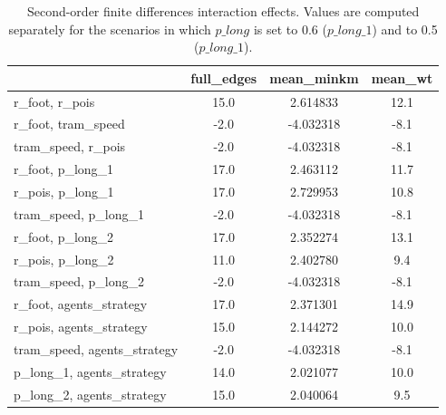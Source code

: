 
\begin{table}[H]
    \raggedright
\scriptsize{
\begin{tabular}{lccc}
\toprule
{} &  full\_edges &  mean\_minkm &  mean\_wt \\
\midrule
r\_foot, r\_pois              &        15.0 &    2.614833 &                  12.1 \\
r\_foot, tram\_speed          &        -2.0 &   -4.032318 &                  -8.1 \\
tram\_speed, r\_pois          &        -2.0 &   -4.032318 &                  -8.1 \\
r\_foot, p\_long\_1            &        17.0 &    2.463112 &                  11.7 \\
r\_pois, p\_long\_1            &        17.0 &    2.729953 &                  10.8 \\
tram\_speed, p\_long\_1        &        -2.0 &   -4.032318 &                  -8.1 \\
r\_foot, p\_long\_2            &        17.0 &    2.352274 &                  13.1 \\
r\_pois, p\_long\_2            &        11.0 &    2.402780 &                   9.4 \\
tram\_speed, p\_long\_2        &        -2.0 &   -4.032318 &                  -8.1 \\
r\_foot, agents\_strategy     &        17.0 &    2.371301 &                  14.9 \\
r\_pois, agents\_strategy     &        15.0 &    2.144272 &                  10.0 \\
tram\_speed, agents\_strategy &        -2.0 &   -4.032318 &                  -8.1 \\
p\_long\_1, agents\_strategy   &        14.0 &    2.021077 &                  10.0 \\
p\_long\_2, agents\_strategy   &        15.0 &    2.040064 &                   9.5 \\
\bottomrule
\end{tabular}}
    \caption{Second-order finite differences interaction effects. Values are computed separately for the scenarios in which $p\_long$ is set to 0.6 ($p\_long\_1$) and to 0.5 ($p\_long\_1$).}
    \label{tab:couples}
\end{table}


